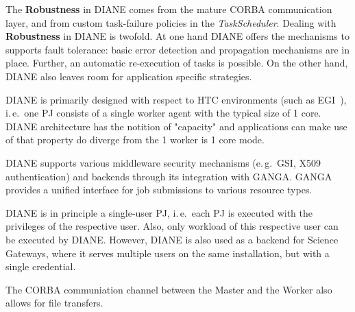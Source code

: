 \documentclass{sig-alternate}
\begin{document}
The \textbf{Robustness} in DIANE comes from the mature CORBA communication
layer, and from custom task-failure policies in the \textit{TaskScheduler}.
Dealing with \textbf{Robustness} in DIANE is twofold.
At one hand DIANE offers the mechanisms to supports fault tolerance: basic
error detection and propagation mechanisms are in place.
Further, an automatic re-execution of tasks is possible.
On the other hand, DIANE also leaves room for application specific strategies.

DIANE is primarily designed with respect to HTC environments (such as
EGI~\cite{egi}), i.\,e.\ one PJ consists of a single worker agent with the
typical size of 1 core. DIANE architecture has the notition of "capacity" and
applications can make use of that property do diverge from the 1 worker is 1
core mode.

DIANE supports various middleware security mechanisms (e.\,g.\ GSI, X509
authentication) and backends through its integration with GANGA.
GANGA provides a unified interface for job submissions to various resource
types.


DIANE is in principle a single-user PJ, i.\,e.\ each PJ is executed with the
privileges of the respective user.
Also, only workload of this respective user can be executed by DIANE.
However, DIANE is also used as a backend for Science Gateways, where it serves
multiple users on the same installation, but with a single credential.

The CORBA communiation channel between the Master and the Worker also allows
for file transfers.


\end{document}
